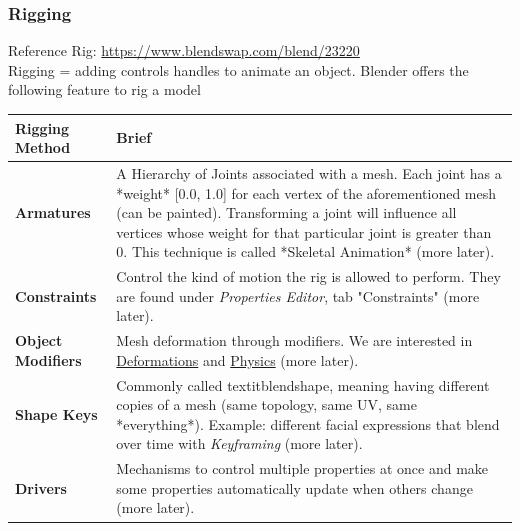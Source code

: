 \documentclass{article}
\begin{document}
\subsubsection{Rigging}
Reference Rig: \url{https://www.blendswap.com/blend/23220}\\
Rigging = adding controls handles to animate an object. Blender offers the following feature to rig a model
\begin{longtable}{p{}p{}}
    \toprule
    \textbf{Rigging Method}   & \textbf{Brief}                                                                                                                                                                                                                                                                                                         \\
    \midrule
    \endhead
    \bottomrule
    \endfoot

    \textbf{Armatures}        & A Hierarchy of Joints associated with a mesh. Each joint has a *weight* [0.0, 1.0] for each vertex of the aforementioned mesh (can be painted). Transforming a joint will influence all vertices whose weight for that particular joint is greater than 0. This technique is called *Skeletal Animation* (more later). \\
    \textbf{Constraints}      & Control the kind of motion the rig is allowed to perform. They are found under \textit{Properties Editor}, tab "Constraints" (more later).                                                                                                                                                                             \\
    \textbf{Object Modifiers} & Mesh deformation through modifiers. We are interested in \href{https://docs.blender.org/manual/en/4.3/modeling/modifiers/deform/index.html}{Deformations} and \href{https://docs.blender.org/manual/en/4.3/modeling/modifiers/physics/index.html}{Physics} (more later).                                               \\
    \textbf{Shape Keys}       & Commonly called textit{blendshape}, meaning having different copies of a mesh (same topology, same UV, same *everything*). Example: different facial expressions that blend over time with \textit{Keyframing} (more later).                                                                                           \\
    \textbf{Drivers}          & Mechanisms to control multiple properties at once and make some properties automatically update when others change (more later).                                                                                                                                                                                       \\
\end{longtable}
\end{document}
